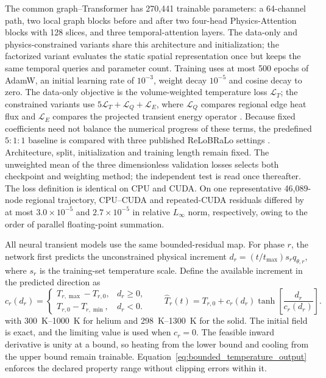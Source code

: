 The common graph--Transformer has 270,441 trainable parameters: a 64-channel
path, two local graph blocks before and after two four-head Physics-Attention
blocks with 128 slices, and three temporal-attention layers. The data-only and
physics-constrained variants share this architecture and initialization; the
factorized variant evaluates the static spatial representation once but keeps
the same temporal queries and parameter count. Training uses at most 500
epochs of AdamW, an initial learning rate of $10^{-3}$, weight decay
$10^{-5}$ and cosine decay to zero. The data-only objective is the
volume-weighted temperature loss $\mathcal L_T$; the constrained variants use
$5\mathcal L_T+\mathcal L_Q+\mathcal L_E$, where $\mathcal L_Q$ compares
regional edge heat flux and $\mathcal L_E$ compares the projected transient
energy operator \cite{li2024pino}. Because fixed coefficients need not balance
the numerical progress of these terms, the predefined $5{:}1{:}1$ baseline is
compared with three published ReLoBRaLo settings \cite{bischof2025relobralo}.
Architecture, split, initialization and training length remain fixed. The
unweighted mean of the three dimensionless validation losses selects both
checkpoint and weighting method; the independent test is read once thereafter.
The loss definition is identical on CPU and CUDA. On one representative
46,089-node regional trajectory, CPU--CUDA and repeated-CUDA residuals differed
by at most $3.0\times10^{-5}$ and $2.7\times10^{-5}$ in relative $L_\infty$
norm, respectively, owing to the order of parallel floating-point summation.

All neural transient models use the same bounded-residual map. For phase $r$,
the network first predicts the unconstrained physical increment
$d_r=(t/t_{\max})s_rq_{\theta,r}$, where $s_r$ is the training-set temperature
scale. Define the available increment in the predicted direction as
\begin{equation}
c_r(d_r)=
\begin{cases}
T_{r,\max}-T_{r,0},&d_r\geq0,\\
T_{r,0}-T_{r,\min},&d_r<0.
\end{cases}
\qquad
\widehat T_r(t)=T_{r,0}+c_r(d_r)
\tanh\!\left[\frac{d_r}{c_r(d_r)}\right].
\label{eq:bounded_temperature_output}
\end{equation}
with \SIrange{300}{1000}{K} for helium and
\SIrange{298}{1300}{K} for the solid. The initial field is exact, and the
limiting value is used when $c_r=0$. The feasible inward derivative is unity at
a bound, so heating from the lower bound and cooling from the upper bound remain
trainable. Equation~\eqref{eq:bounded_temperature_output} enforces the declared
property range without clipping errors within it.

